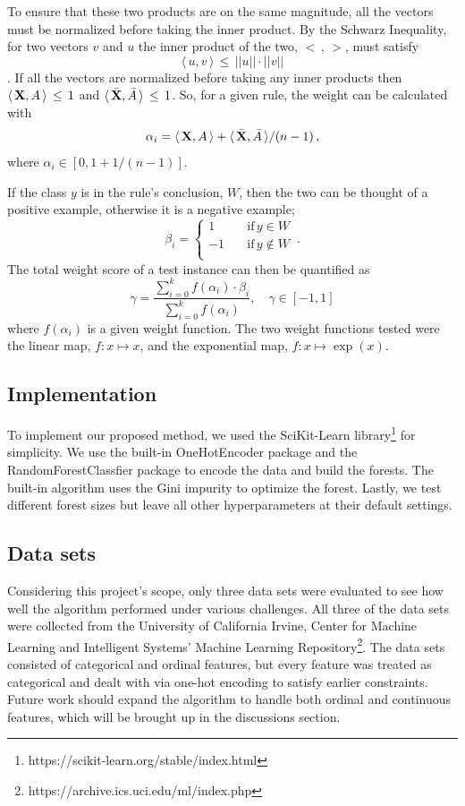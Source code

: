 \documentclass[11pt]{article}
\begin{document}
To ensure that these two products are on the same magnitude, all the vectors must be normalized before taking the inner product. By the Schwarz Inequality, for two vectors $v$ and $u$ the inner product of the two, $< \, , \, >$, must satisfy 
\[\langle \,u, v \, \rangle \, \leq \,  ||u|| \cdot ||v||\]
\citep{strang2006linear}. If all the vectors are normalized before taking any inner products then $\langle \,\vb{X}, A \, \rangle \,\leq\, 1$ and $\langle \, \bar{\vb{X}}, \bar{A} \, \rangle \, \leq \, 1$. So, for a given rule, the weight can be calculated with 
\[\alpha_i = \langle \,\vb{X}, A \, \rangle + \langle \, \bar{\vb{X}}, \bar{A} \, \rangle / (n-1) \, ,\]
where $\alpha_i \in [0, 1+ 1/(n-1)]$.

If the class $y$ is in the rule's conclusion, $W$, then the two can be thought of a positive example, otherwise it is a negative example;
\begin{equation*}
\beta_i=\begin{cases}
          1 \quad &\text{if} \, y \in W \\
          -1 \quad &\text{if} \, y \notin W\\
     \end{cases} \, .
\end{equation*}
The total weight score of a test instance can then be quantified as 
\begin{equation}
\gamma = \frac{\sum\limits_{i=0}^k f(\alpha_i) \cdot \beta_i}{\sum\limits_{i=0}^k f(\alpha_i)},  \quad \gamma \in [-1, 1]
\label{eq:rule_meas}
\end{equation}
where $f(\alpha_i)$ is a given weight function. The two weight functions tested were the linear map, $f: x\mapsto x$, and the exponential map, $f: x\mapsto \exp(x)$. 


\subsection{Implementation}
To implement our proposed method, we used the SciKit-Learn library\footnote{https://scikit-learn.org/stable/index.html} for simplicity. We use the built-in OneHotEncoder package and the RandomForestClassfier package to encode the data and build the forests. The built-in algorithm uses the Gini impurity to optimize the forest. Lastly, we test different forest sizes but leave all other hyperparameters at their default settings.

\subsection{Data sets}
Considering this project's scope, only three data sets were evaluated to see how well the algorithm performed under various challenges. All three of the data sets were collected from the University of California Irvine, Center for Machine Learning and Intelligent Systems' Machine Learning Repository\footnote{https://archive.ics.uci.edu/ml/index.php}. The data sets consisted of categorical and ordinal features, but every feature was treated as categorical and dealt with via one-hot encoding to satisfy earlier constraints. Future work should expand the algorithm to handle both ordinal and continuous features, which will be brought up in the discussions section.
\end{document}

